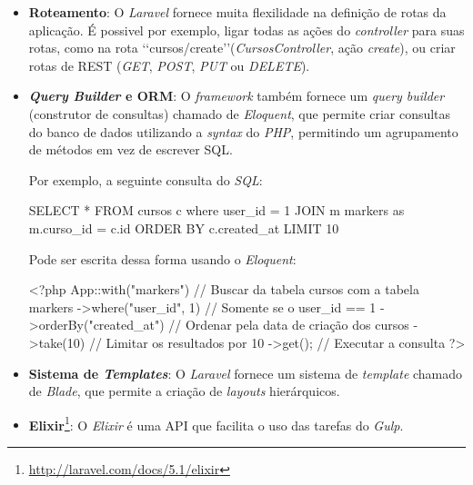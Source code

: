 \begin{itemize}
  \item \textbf{Roteamento}: O \textit{Laravel} fornece muita flexilidade na definição de rotas da aplicação. É possivel por exemplo, ligar todas as ações do \textit{controller} para suas rotas, como na rota \lq\lq cursos/create\rq\rq (\textit{CursosController}, ação \textit{create}), ou criar rotas de \ac{REST} (\textit{GET}, \textit{POST}, \textit{PUT} ou \textit{DELETE}).
  \item \textbf{\textit{Query Builder} e \ac{ORM}}: O \textit{framework} também fornece um \textit{query builder} (construtor de consultas) chamado de \textit{Eloquent}, que permite criar consultas do banco de dados utilizando a \textit{syntax} do \textit{PHP}, permitindo um agrupamento de métodos em vez de escrever \ac{SQL}.
  
  Por exemplo, a seguinte consulta do \textit{SQL}:
  \begin{listing}
    \begin{sqlcode}
      SELECT * FROM cursos c where user_id = 1
      JOIN m markers as m.curso_id = c.id
      ORDER BY c.created_at
      LIMIT 10
    \end{sqlcode}
    \caption{Busca simples do SQL. Buscar todos os cursos em que o user\_id seja igual a 1, unir os resultados com a tabela markers, ordenar pela data de criação do curso, e limitar os resultados por 10}
    \label{lst:sql_example_eloquent}
  \end{listing}
  \par
  Pode ser escrita dessa forma usando o \textit{Eloquent}:
  \begin{listing}
    \begin{phpcode}
      <?php
      App\Curso::with("markers") // Buscar da tabela cursos com a tabela markers
      ->where("user_id", 1) // Somente se o user_id == 1
      ->orderBy("created_at") // Ordenar pela data de criação dos cursos
      ->take(10) // Limitar os resultados por 10
      ->get(); // Executar a consulta
      ?>
    \end{phpcode}
    \caption{Consulta \ref{lst:sql_example_eloquent} em Eloquent}
    \label{lst:php_example_eloquent}
  \end{listing}
  \par
  \item \textbf{Sistema de \textit{Templates}}: O \textit{Laravel} fornece um sistema de \textit{template} chamado de \textit{Blade}, que permite a criação de \textit{layouts} hierárquicos.
  \item \textbf{Elixir}\footnote{\url{http://laravel.com/docs/5.1/elixir}}: O \textit{Elixir} é uma \ac{API} que facilita o uso das tarefas do \textit{Gulp}.
\end{itemize}

